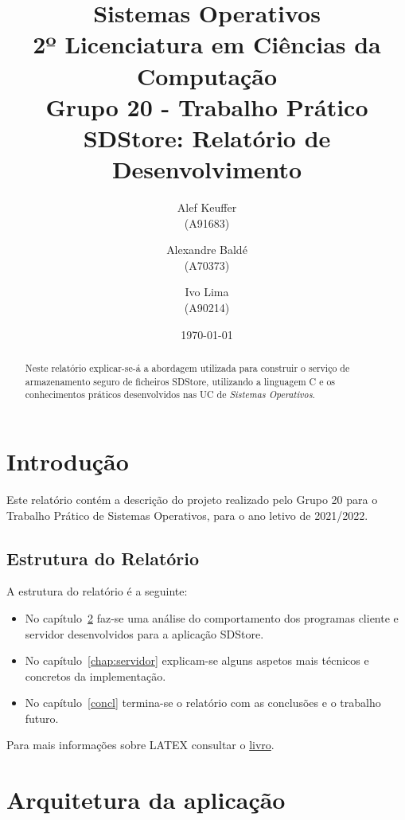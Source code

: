 \documentclass[11pt,a4paper]{report}%
\title{Sistemas Operativos\\
      2º Licenciatura em Ciências da Computação \\
      \textbf{Grupo 20 - Trabalho Prático}\\ SDStore: Relatório de Desenvolvimento
      } %
\author{Alef Keuffer\\ (A91683) \and Alexandre Baldé\\ (A70373)
         \and Ivo Lima\\ (A90214)
       } %
\date{\today} %
\def\so{\emph{Sistemas Operativos}\xspace}
\begin{document}
\maketitle %

\begin{abstract}  %
Neste relatório explicar-se-á a abordagem utilizada para construir o serviço de
armazenamento seguro de ficheiros SDStore, utilizando a linguagem C e os conhecimentos
práticos desenvolvidos nas UC de \so.
\end{abstract}

\tableofcontents %
\listoffigures %

\chapter{Introdução} \label{chap:intro} %

Este relatório contém a descrição do projeto realizado pelo Grupo 20 para
o Trabalho Prático de Sistemas Operativos, para o ano letivo de 2021/2022.


\section*{Estrutura do Relatório}

A estrutura do relatório é a seguinte:
\begin{itemize}
\item No capítulo~\ref{chap:analysis} faz-se uma análise do comportamento dos
  programas cliente e servidor desenvolvidos para a aplicação SDStore.

\item No capítulo~\ref{chap:servidor} explicam-se alguns aspetos mais técnicos e concretos da implementação.

\item No capítulo~\ref{concl} termina-se o relatório com as conclusões e o trabalho futuro.
\end{itemize}

Para mais informações sobre LATEX consultar o
 \href{http://www.ptep-online.com/ctan/lshort_port.pdf}{livro}.

\chapter{Arquitetura da aplicação} \label{chap:analysis} %
\end{document}
